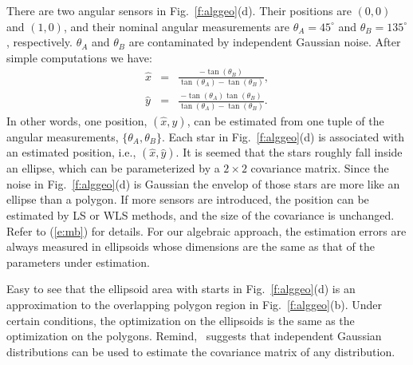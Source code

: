 There are two angular sensors in Fig.~\ref{f:alggeo}(d). Their positions are $(0,0)$ and $(1,0)$, and their nominal angular measurements are $\theta_A=45^\circ$ and $\theta_B=135^\circ$, respectively. $\theta_A$ and $\theta_B$ are contaminated by independent Gaussian noise. After simple computations we have:
\begin{eqnarray*}
  \hat{x} &=& \frac{-\tan(\theta_B)}{\tan(\theta_A)-\tan(\theta_B)}, \\
  \hat{y} &=& \frac{-\tan(\theta_A)\tan(\theta_B)}{\tan(\theta_A)-\tan(\theta_B)}.
\end{eqnarray*}
In other words, one position, $(\hat{x},\hat{y})$, can be estimated from one tuple of the angular measurements, $\{\theta_A, \theta_B\}$.
 Each star in Fig.~\ref{f:alggeo}(d) is associated with an estimated position, i.e., $(\hat{x}, \hat{y})$. It is seemed that the stars roughly fall inside an ellipse, which can be parameterized by a $2\times 2$ covariance matrix. Since the noise in Fig.~\ref{f:alggeo}(d) is Gaussian the envelop of those stars are more like an ellipse than a polygon.
  If more sensors are introduced, the position can be estimated by LS or WLS methods, and the size of the covariance is unchanged. Refer to (\ref{e:mb}) for details. For our algebraic approach, the estimation errors are always measured in ellipsoids whose dimensions are the same as that of the parameters under estimation.


 Easy to see that the ellipsoid area with starts in Fig.~\ref{f:alggeo}(d) is an approximation to the overlapping polygon region in Fig.~\ref{f:alggeo}(b). %
 Under certain conditions, the optimization on the ellipsoids is the same as the optimization on the polygons. Remind,~\cite{EmeryOED98} suggests that independent Gaussian distributions can be used to estimate the covariance matrix of any distribution.


